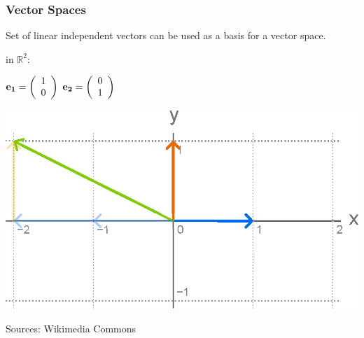 \begin{frame}
    \frametitle{Vector Spaces}

    Set of linear independent vectors can be used as a basis for a vector space.\newline

    \myExample in $\mathbb{R}^2$:

    \begin{center}

        $\bf{e}_1= \left( \begin{array}{cc} 1 \\ 0 \end{array} \right)$
        \hspace{10 mm}
        $\bf{e}_2= \left( \begin{array}{cc} 0 \\ 1 \end{array} \right)$\newline

        \includegraphics[height=.45\textheight ]{images/2DPlane}

        \begin{flushright}
            \scriptsize Sources: Wikimedia Commons
        \end{flushright}
    \end{center}\end{frame}



